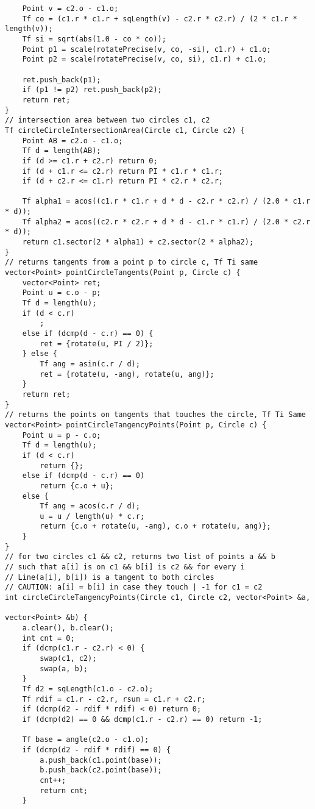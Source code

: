 \documentclass[FSZ,a4paper,onesided]{article}
\begin{document}
\begin{multicols*}{\COLS}
\begin{lstlisting}
    Point v = c2.o - c1.o;
    Tf co = (c1.r * c1.r + sqLength(v) - c2.r * c2.r) / (2 * c1.r * length(v));
    Tf si = sqrt(abs(1.0 - co * co));
    Point p1 = scale(rotatePrecise(v, co, -si), c1.r) + c1.o;
    Point p2 = scale(rotatePrecise(v, co, si), c1.r) + c1.o;

    ret.push_back(p1);
    if (p1 != p2) ret.push_back(p2);
    return ret;
}
// intersection area between two circles c1, c2
Tf circleCircleIntersectionArea(Circle c1, Circle c2) {
    Point AB = c2.o - c1.o;
    Tf d = length(AB);
    if (d >= c1.r + c2.r) return 0;
    if (d + c1.r <= c2.r) return PI * c1.r * c1.r;
    if (d + c2.r <= c1.r) return PI * c2.r * c2.r;

    Tf alpha1 = acos((c1.r * c1.r + d * d - c2.r * c2.r) / (2.0 * c1.r * d));
    Tf alpha2 = acos((c2.r * c2.r + d * d - c1.r * c1.r) / (2.0 * c2.r * d));
    return c1.sector(2 * alpha1) + c2.sector(2 * alpha2);
}
// returns tangents from a point p to circle c, Tf Ti same
vector<Point> pointCircleTangents(Point p, Circle c) {
    vector<Point> ret;
    Point u = c.o - p;
    Tf d = length(u);
    if (d < c.r)
        ;
    else if (dcmp(d - c.r) == 0) {
        ret = {rotate(u, PI / 2)};
    } else {
        Tf ang = asin(c.r / d);
        ret = {rotate(u, -ang), rotate(u, ang)};
    }
    return ret;
}
// returns the points on tangents that touches the circle, Tf Ti Same
vector<Point> pointCircleTangencyPoints(Point p, Circle c) {
    Point u = p - c.o;
    Tf d = length(u);
    if (d < c.r)
        return {};
    else if (dcmp(d - c.r) == 0)
        return {c.o + u};
    else {
        Tf ang = acos(c.r / d);
        u = u / length(u) * c.r;
        return {c.o + rotate(u, -ang), c.o + rotate(u, ang)};
    }
}
// for two circles c1 && c2, returns two list of points a && b
// such that a[i] is on c1 && b[i] is c2 && for every i
// Line(a[i], b[i]) is a tangent to both circles
// CAUTION: a[i] = b[i] in case they touch | -1 for c1 = c2
int circleCircleTangencyPoints(Circle c1, Circle c2, vector<Point> &a,
                                                              vector<Point> &b) {
    a.clear(), b.clear();
    int cnt = 0;
    if (dcmp(c1.r - c2.r) < 0) {
        swap(c1, c2);
        swap(a, b);
    }
    Tf d2 = sqLength(c1.o - c2.o);
    Tf rdif = c1.r - c2.r, rsum = c1.r + c2.r;
    if (dcmp(d2 - rdif * rdif) < 0) return 0;
    if (dcmp(d2) == 0 && dcmp(c1.r - c2.r) == 0) return -1;

    Tf base = angle(c2.o - c1.o);
    if (dcmp(d2 - rdif * rdif) == 0) {
        a.push_back(c1.point(base));
        b.push_back(c2.point(base));
        cnt++;
        return cnt;
    }


\end{lstlisting}
\end{multicols*}
\end{document}

